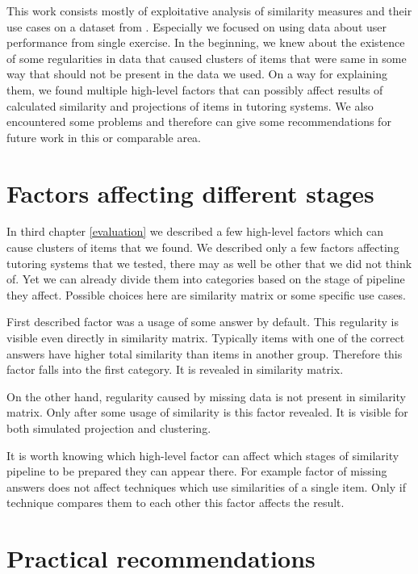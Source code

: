 \documentclass[
  digital, %
  table,   %
  nolof,     %
  nolot,     %
  nocover,
  color,
  final, %
]{fithesis3}
\begin{document}
This work consists mostly of exploitative analysis of similarity measures and their use cases on a dataset from \umimeCesky{}. Especially we focused on using data about user performance from single exercise. In the beginning, we knew about the existence of some regularities in data that caused clusters of items that were same in some way that should not be present in the data we used. On a way for explaining them, we found multiple high-level factors that can possibly affect results of calculated similarity and projections of items in tutoring systems. We also encountered some problems and therefore can give some recommendations for future work in this or comparable area.


\section{Factors affecting different stages}\label{factors-affecting-different-stages}

In third chapter \ref{evaluation} we described a few high-level factors which can cause clusters of items that we found. We described only a few factors affecting tutoring systems that we tested, there may as well be other that we did not think of. Yet we can already divide them into categories based on the stage of pipeline they affect. Possible choices here are similarity matrix or some specific use cases.

First described factor was a usage of some answer by default. This regularity is visible even directly in similarity matrix. Typically items with one of the correct answers have higher total similarity than items in another group. Therefore this factor falls into the first category. It is revealed in similarity matrix.

On the other hand, regularity caused by missing data is not present in similarity matrix. Only after some usage of similarity is this factor revealed. It is visible for both simulated projection and clustering.

It is worth knowing which high-level factor can affect which stages of similarity pipeline to be prepared they can appear there. For example factor of missing answers does not affect techniques which use similarities of a single item. Only if technique compares them to each other this factor affects the result.


\section{Practical recommendations}\label{practical-recommendations}
\end{document}
